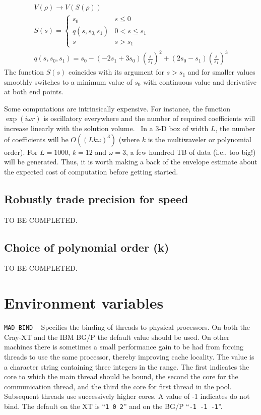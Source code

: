 \begin{equation}
\begin{gathered}V(\rho )\to V(S(\rho ))\\S(s)=\left\{\begin{matrix}s_{0}&s\le 0\\q(s,s_{0,}s_{1})&0<s\le
s_{1}\\s&s>s_{1}\end{matrix}\right.\\q(s,s_{0},s_{1})=s_{0}-(-2s_{1}+3s_{0})\left(\frac{s}{s_{1}}\right)^{2}+(2s_{0}-s_{1})\left(\frac{s}{s_{1}}\right)^{3}\end{gathered}
\end{equation}
The function  $S(s)$ coincides with its argument for  $s>s_{1}$ and for smaller values smoothly switches to a minimum
value of  $s_{0}$ with continuous value and derivative at both end points.

Some computations are intrinsically expensive. For instance, the function  $\exp (i\omega r)$ is oscillatory everywhere
and the number of required coefficients will increase linearly with the solution volume. \ In a 3-D box of width  $L$,
the number of coefficients will be  $O\left(\left(Lk\omega \right)^{3}\right)$ (where  $k$ is the multiwaveler or
polynomial order). For  $L=1000$,  $k=12$ and  $\omega =3$, a few hundred TB of data (i.e., too big!) will be
generated. Thus, it is worth making a back of the envelope estimate about the expected cost of computation before
getting started.

\subsection[Robustly trade precision for speed]{Robustly trade precision for speed}
TO BE COMPLETED.

\subsection{Choice of polynomial order (k)}
TO BE COMPLETED.

\section{Environment variables}
\texttt{MAD\_BIND} -- Specifies the binding of threads to physical processors. On both the Cray-XT and the IBM BG/P the
default value should be used. On other machines there is sometimes a small performance gain to be had from forcing
threads to use the same processor, thereby improving cache locality. The value is a character string containing three
integers in the range. The first indicates the core to which the main thread should be bound, the second the core for
the communication thread, and the third the core for first thread in the pool. Subsequent threads use successively
higher cores. A value of -1 indicates do not bind. The default on the XT is ``\texttt{1 0 2}{}'' and on the BG/P
``\texttt{{}-1 -1 -1}{}''.

